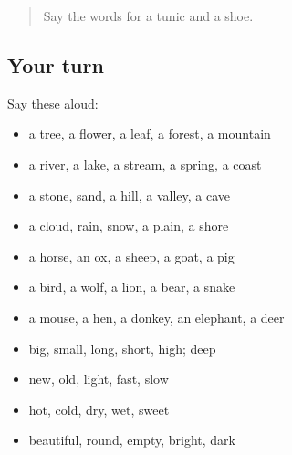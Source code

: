 \begin{quote}
Say the words for a tunic and a shoe.
\end{quote}

\subsection*{Your turn}
Say these aloud:

\begin{itemize}
\raggedright
  \item a tree, a flower, a leaf, a forest, a mountain
  \item a river, a lake, a stream, a spring, a coast
  \item a stone, sand, a hill, a valley, a cave
  \item a cloud, rain, snow, a plain, a shore
  \item a horse, an ox, a sheep, a goat, a pig
  \item a bird, a wolf, a lion, a bear, a snake
  \item a mouse, a hen, a donkey, an elephant, a deer
  \item big, small, long, short, high; deep
  \item new, old, light, fast, slow
  \item hot, cold, dry, wet, sweet
  \item beautiful, round, empty, bright, dark
\end{itemize}

